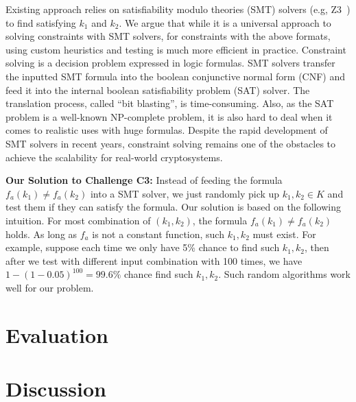 Existing approach relies on satisfiability modulo theories (SMT) solvers (e.g,
Z3~\cite{DeMoura:2008:ZES:1792734.1792766}) to find satisfying $k_1$ and $k_2$.
We argue that while it is a universal approach to solving constraints with SMT
solvers, for constraints with the above formats, using custom heuristics and
testing is much more efficient in practice. Constraint solving is a decision
problem expressed in logic formulas. SMT solvers transfer the inputted SMT
formula into the boolean conjunctive normal form (CNF) and feed it into the
internal boolean satisfiability problem (SAT) solver. The translation process,
called ``bit blasting'', is time-consuming. Also, as the SAT problem is a
well-known NP-complete problem, it is also hard to deal when it comes to
realistic uses with huge formulas. Despite the rapid development of SMT solvers
in recent years, constraint solving remains one of the obstacles to achieve the
scalability for real-world cryptosystems.

\vspace*{2pt}
\textbf{Our Solution to Challenge C3:}
Instead of feeding the formula $f_a(k_1) \neq f_a(k_2)$ into a SMT solver, we
just randomly pick up $k_1, k_2 \in K$ and test them if they can satisfy the
formula. Our solution is based on the following intuition. For most combination
of $(k_{1}, k_{2} )$, the formula $f_a(k_1) \neq f_a(k_2)$ holds. As long as
$f_a$ is not a constant function, such $k_1, k_2$ must exist. For example,
suppose each time we only have 5\% chance to find such $k_1, k_2$, then after we
test with different input combination with 100 times, we have $1 -
(1-0.05)^{100} = 99.6\%$ chance find such $k_1, k_2$. Such random algorithms
work well for our problem.
\section{Evaluation}

\section{Discussion}

